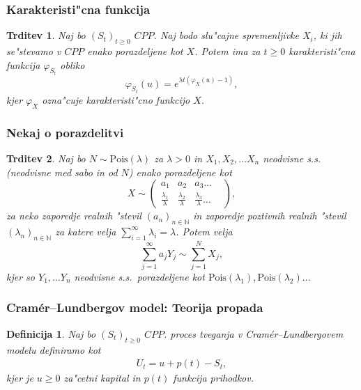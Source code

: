 \documentclass[]{beamer} %
\theoremstyle{plain}
\newtheorem{definicija}{Definicija}
\newtheorem{trditev}{Trditev}
\newcommand{\N}{\mathbb{N}}
\newcommand{\1}{\mathds{1}}
\newcommand{\Pois}[1]{\text{Pois}(#1)}
\begin{document}
\begin{frame}
  \frametitle{Karakteristi"cna funkcija}
  \begin{trditev}
    Naj bo $(S_t)_{t\geq0}$ $CPP$. Naj bodo slu"cajne spremenljivke $X_i$, ki jih se"stevamo v 
    $CPP$ enako porazdeljene kot $X$. Potem ima za $t\geq0$ karakteristi"cna funkcija $\varphi_{S_t}$ 
    obliko
    \begin{equation*}
        \varphi_{S_t}(u) = e^{\lambda t\left(\varphi_X(u) - 1\right)}, 
    \end{equation*}
    kjer $\varphi_X$ ozna"cuje karakteristi"cno funkcijo $X$.
    \label{trd:MomentGener}
    \end{trditev}
\end{frame}

\begin{frame}
    \frametitle{Nekaj o porazdelitvi}
    \begin{trditev}
        Naj bo $N\sim \Pois{\lambda}$  za $\lambda >0$ in $X_1, X_2, \dots X_n$ neodvisne s.s. (neodvisne 
        med sabo in od $N$) enako porazdeljene kot
        $$ X\sim
        \begin{pmatrix}
            a_1 & a_2 & a_3  \dots & \\
            \tfrac{\lambda_1}{\lambda} & \tfrac{\lambda_2}{\lambda} & \tfrac{\lambda_3}{\lambda} \dots & 
        \end{pmatrix},
        $$
        za neko zaporedje realnih "stevil $(a_n)_{n\in\N}$ in 
        zaporedje poztivnih realnih "stevil $(\lambda_n)_{n\in\N}$ za katere velja 
        ${\sum_{i=1}^\infty\lambda_i = \lambda}$.
        Potem velja 
        \begin{equation*}
            \sum_{j=1}^\infty a_jY_j \sim \sum_{j=1}^NX_j,
        \end{equation*}
        kjer so $Y_1, \dots Y_n$ neodvisne s.s.\ porazdeljene kot 
        $\Pois{\lambda_1}, \Pois{\lambda_2} \dots $
        \label{trd:NXjeEnakoaY}
    \end{trditev}
\end{frame}

\begin{frame}
    \frametitle{Cramér--Lundbergov model: Teorija propada}
    \begin{definicija}
        Naj bo $(S_t)_{t\geq0}$ $CPP$.
        \textit{proces tveganja} v Cramér--Lundbergovem modelu definiramo kot
        \begin{align*}
            U_t = u + p(t) - S_t,
        \end{align*}
        kjer je $u \geq 0$ za"cetni kapital in $p(t)$ funkcija prihodkov. 
        \label{def:procesTveganja}
    \end{definicija}
\end{frame}
\end{document}
